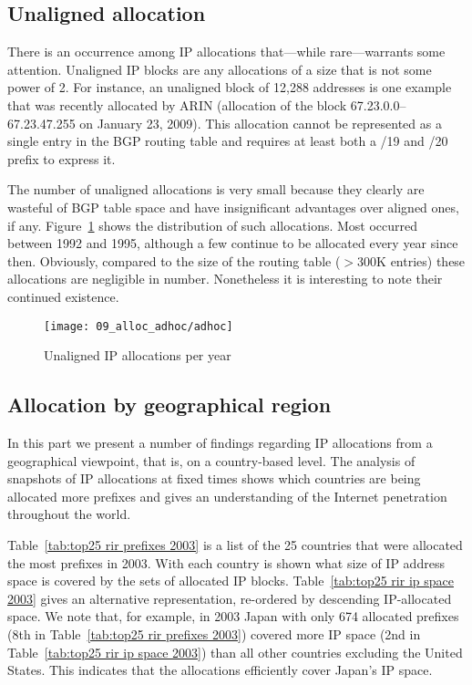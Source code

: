 \subsection{Unaligned allocation}

There is an occurrence among IP allocations that---while rare---warrants some
attention. Unaligned IP blocks are any allocations of a size that is not some
power of 2. For instance, an unaligned block of 12,288 addresses is one example
that was recently allocated by ARIN (allocation of the block
67.23.0.0--67.23.47.255 on January 23, 2009). This allocation cannot be
represented as a single entry in the BGP routing table and requires at least
both a /19 and /20 prefix to express it.

The number of unaligned allocations is very small because they clearly are
wasteful of BGP table space and have insignificant advantages over aligned
ones, if any. Figure~\ref{fig:unaligned IP allocations} shows the distribution
of such allocations. Most occurred between 1992 and 1995, although a few
continue to be allocated every year since then. Obviously, compared to the size
of the routing table ($>$300K entries) these allocations are negligible in
number. Nonetheless it is interesting to note their continued existence.

\begin{figure}[htbp]
 	\centering
 		\texttt{[image: 09\_alloc\_adhoc/adhoc]}
	\caption{Unaligned IP allocations per year}
 	\label{fig:unaligned IP allocations}
\end{figure}

\subsection{Allocation by geographical region}




In this part we present a number of findings regarding IP allocations from a
geographical viewpoint, that is, on a country-based level. The analysis of
snapshots of IP allocations at fixed times shows which countries are being
allocated more prefixes and gives an understanding of the Internet penetration
throughout the world.

Table~\ref{tab:top25 rir prefixes 2003} is a list of the 25 countries that were
allocated the most prefixes in 2003.  With each country is shown what size of
IP address space is covered by the sets of allocated IP blocks.
Table~\ref{tab:top25 rir ip space 2003} gives an alternative representation,
re-ordered by descending IP-allocated space.  We note that, for example, in
2003 Japan with only 674 allocated prefixes (8th in Table~\ref{tab:top25 rir
prefixes 2003}) covered more IP space (2nd in Table~\ref{tab:top25 rir ip space
2003}) than all other countries excluding the United States.  This indicates
that the allocations efficiently cover Japan's IP space.

